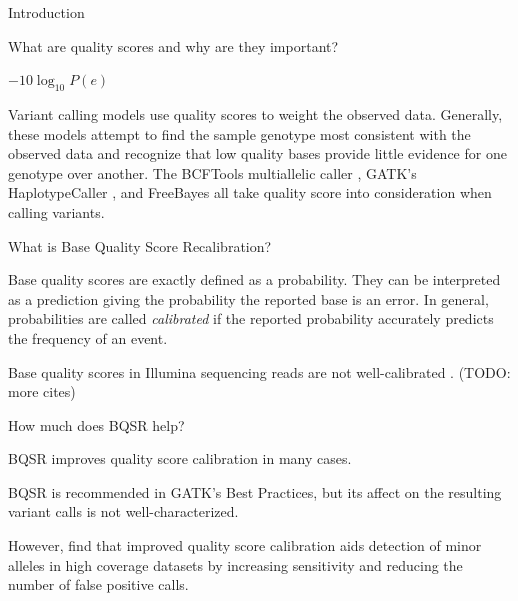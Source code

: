 \documentclass{article}
\begin{document}
\linenumbers
\begin{outline}
	\item Introduction
	\begin{outline}
		\item What are quality scores and why are they important? \parencite{ewing_base-calling_1998} \parencite{ewing_base-calling_1998-1}
		\begin{outline}
			\item $-10\log_{10}P(e)$ \parencite{ewing_base-calling_1998} \parencite{ewing_base-calling_1998-1}
			\item Variant calling models use quality scores to weight the observed data. Generally, these models attempt to find the sample genotype most consistent with the observed data and recognize that low quality bases provide little evidence for one genotype over another. The BCFTools multiallelic caller \parencite{li_sequence_2009}, GATK's HaplotypeCaller \parencite{poplin_scaling_2018}, and FreeBayes \parencite{garrison_haplotype-based_2012} all take quality score into consideration when calling variants.
		\end{outline}
		\item What is Base Quality Score Recalibration?
		\begin{outline}
			\item Base quality scores are exactly defined as a probability. They can be interpreted as a prediction giving the probability the reported base is an error. In general, probabilities are called \textit{calibrated} if the reported probability accurately predicts the frequency of an event.
			\item Base quality scores in Illumina sequencing reads are not well-calibrated \parencite{callahan_dada2:_2016}. (TODO: more cites)
		\end{outline}
		\item How much does BQSR help?
		\begin{outline}
			\item BQSR improves quality score calibration in many cases.
			\item BQSR is recommended in GATK's Best Practices, but its affect on the resulting variant calls is not well-characterized.
			\begin{outline}
				\item However, \cite{ni_improvement_2016} find that improved quality score calibration aids detection of minor alleles in high coverage datasets by increasing sensitivity and reducing the number of false positive calls.

\end{outline}
\end{outline}
\end{outline}
\end{outline}
\end{document}
